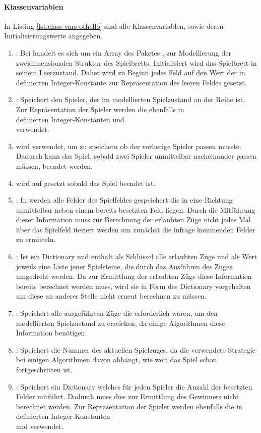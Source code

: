 \paragraph{Klassenvariablen}
In Listing \ref{lst:class-vars-othello} sind alle Klassenvariablen, sowie deren Initialisierungswerte angegeben.
\begin{enumerate}
\item {}: Bei  handelt es sich um ein Array des Paketes , zur Modellierung der zweidimensionalen Struktur des Spielbretts. Initialisiert wird das Spielbrett in seinem Leerzustand. Daher wird zu Beginn jedes Feld auf den Wert der in  definierten Integer-Konstante  zur Repräsentation des leeren Feldes gesetzt.
\item {}: Speichert den Spieler, der im modellierten Spielzustand an der Reihe ist. Zur Repräsentation der Spieler werden die ebenfalls in \\ definierten Integer-Konstanten  und \\ verwendet.
\item {} wird verwendet, um zu speichern ob der vorherige Spieler passen musste. Dadurch kann das Spiel, sobald zwei Spieler unmittelbar nacheinander passen müssen, beendet werden.
\item {} wird auf  gesetzt sobald das Spiel beendet ist.
\item {}: In  werden alle Felder des Spielfeldes gespeichert die in eine Richtung unmittelbar neben einem bereits besetzten Feld liegen. Durch die Mitführung dieser Information muss zur Berechnung der erlaubten Züge nicht jedes Mal über das Spielfeld iteriert werden um zunächst die infrage kommenden Felder zu ermitteln.
\item {}: Ist ein Dictionary und enthält als Schlüssel alle erlaubten Züge und als Wert jeweils eine Liste jener Spielsteine, die durch das Ausführen des Zuges umgedreht werden. Da zur Ermittlung der erlaubten Züge diese Information bereits berechnet werden muss, wird sie in Form des Dictionary vorgehalten um diese an anderer Stelle nicht erneut berechnen zu müssen.
\item {}: Speichert alle ausgeführten Züge die erforderlich waren, um den modellierten Spielzustand zu erreichen, da einige Algorithmen diese Information benötigen.
\item {}: Speichert die Nummer des aktuellen Spielzuges, da die verwendete Strategie bei einigen Algorithmen davon abhängt, wie weit das Spiel schon fortgeschritten ist.
\item {}: Speichert ein Dictionary welches für jeden Spieler die Anzahl der besetzten Felder mitführt. Dadurch muss dies zur Ermittlung des Gewinners nicht berechnet werden. Zur Repräsentation der Spieler werden ebenfalls die in  definierten Integer-Konstanten \\ und  verwendet.
\end{enumerate}
